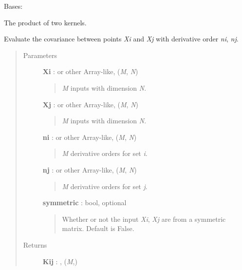 \documentclass[letterpaper,10pt,english]{sphinxmanual}
\begin{document}
\begin{fulllineitems}
\label{gptools.kernel:gptools.kernel.core.ProductKernel}
Bases: {\hyperref[gptools.kernel:gptools.kernel.core.BinaryKernel]{}}

The product of two kernels.

\begin{fulllineitems}
\label{gptools.kernel:gptools.kernel.core.ProductKernel.__call__}
Evaluate the covariance between points \emph{Xi} and \emph{Xj} with derivative order \emph{ni}, \emph{nj}.
\begin{quote}\begin{description}
\item[{Parameters }] \leavevmode
\textbf{Xi} :  or other Array-like, (\emph{M}, \emph{N})
\begin{quote}

\emph{M} inputs with dimension \emph{N}.
\end{quote}

\textbf{Xj} :  or other Array-like, (\emph{M}, \emph{N})
\begin{quote}

\emph{M} inputs with dimension \emph{N}.
\end{quote}

\textbf{ni} :  or other Array-like, (\emph{M}, \emph{N})
\begin{quote}

\emph{M} derivative orders for set \emph{i}.
\end{quote}

\textbf{nj} :  or other Array-like, (\emph{M}, \emph{N})
\begin{quote}

\emph{M} derivative orders for set \emph{j}.
\end{quote}

\textbf{symmetric} : bool, optional
\begin{quote}

Whether or not the input \emph{Xi}, \emph{Xj} are from a symmetric matrix.
Default is False.
\end{quote}

\item[{Returns }] \leavevmode
\textbf{Kij} : , (\emph{M},)
\begin{quote}


\end{quote}
\end{description}
\end{quote}
\end{fulllineitems}
\end{fulllineitems}
\end{document}
